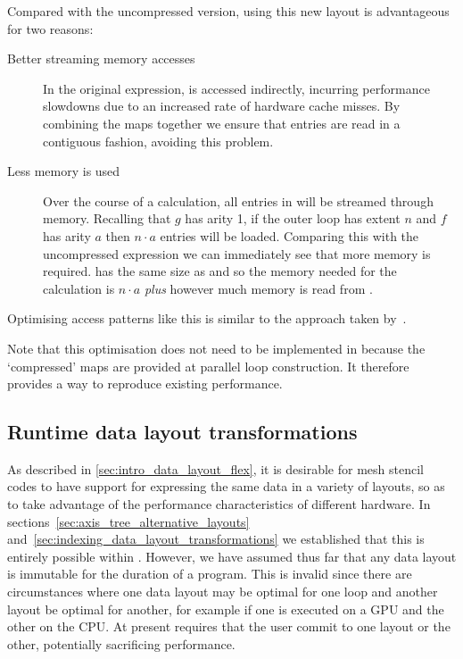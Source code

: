 \documentclass[thesis]{subfiles}
\begin{document}
Compared with the uncompressed version, using this new layout is advantageous for two reasons:
\begin{description}
  \item[Better streaming memory accesses]
    In the original expression,  is accessed indirectly, incurring performance slowdowns due to an increased rate of hardware cache misses.
    By combining the maps together we ensure that entries are read in a contiguous fashion, avoiding this problem.
  \item[Less memory is used]
    Over the course of a calculation, all entries in  will be streamed through memory.
    Recalling that $g$ has arity 1, if the outer loop has extent $n$ and $f$ has arity $a$ then $n\cdot a$ entries will be loaded.
    Comparing this with the uncompressed expression we can immediately see that more memory is required.
     has the same size as  and so the memory needed for the calculation is $n\cdot a$ \emph{plus} however much memory is read from .
\end{description}

Optimising access patterns like this is similar to the approach taken by~\cite{dasSlicingAnalysisIndirect1994}.

Note that this optimisation does not need to be implemented in  because the `compressed' maps are provided at parallel loop construction.
It therefore provides a way to reproduce existing  performance.

\subsection{Runtime data layout transformations}

As described in \cref{sec:intro_data_layout_flex}, it is desirable for mesh stencil codes to have support for expressing the same data in a variety of layouts, so as to take advantage of the performance characteristics of different hardware.
In sections~\ref{sec:axis_tree_alternative_layouts} and~\ref{sec:indexing_data_layout_transformations} we established that this is entirely possible within .
However, we have assumed thus far that any data layout is immutable for the duration of a program.
This is invalid since there are circumstances where one data layout may be optimal for one loop and another layout be optimal for another, for example if one is executed on a GPU and the other on the CPU.
At present  requires that the user commit to one layout or the other, potentially sacrificing performance.
\end{document}
